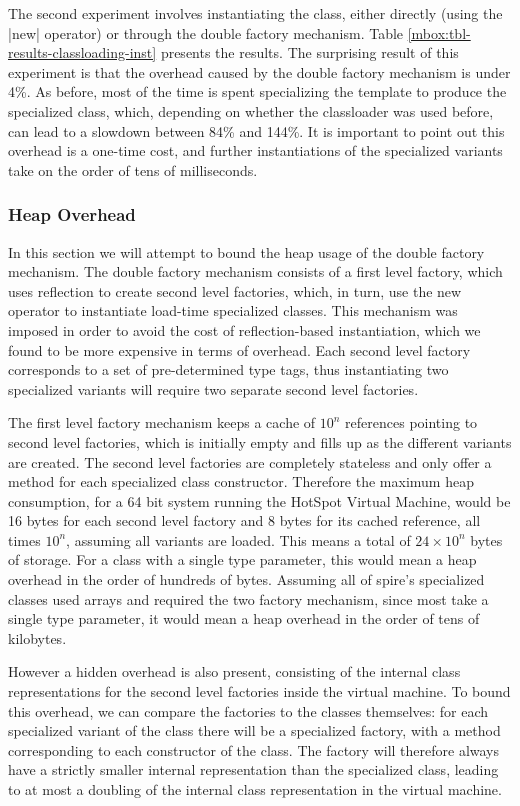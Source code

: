The second experiment involves instantiating the class, either directly (using the |new| operator) or through the double factory mechanism. Table \ref{mbox:tbl-results-classloading-inst} presents the results. The surprising result of this experiment is that the overhead caused by the double factory mechanism is under 4\%. As before, most of the time is spent specializing the template to produce the specialized class, which, depending on whether the classloader was used before, can lead to a slowdown between 84\% and 144\%. It is important to point out this overhead is a one-time cost, and further instantiations of the specialized variants take on the order of tens of milliseconds.

\subsubsection*{Heap Overhead}

In this section we will attempt to bound the heap usage of the double factory mechanism. The double factory mechanism consists of a first level factory, which uses reflection to create second level factories, which, in turn, use the new operator to instantiate load-time specialized classes. This mechanism was imposed in order to avoid the cost of reflection-based instantiation, which we found to be more expensive in terms of overhead. Each second level factory corresponds to a set of pre-determined type tags, thus instantiating two specialized variants will require two separate second level factories.

The first level factory mechanism keeps a cache of $10^n$ references pointing to second level factories, which is initially empty and fills up as the different variants are created. The second level factories are completely stateless and only offer a method for each specialized class constructor. Therefore the maximum heap consumption, for a 64 bit system running the HotSpot Virtual Machine, would be 16 bytes for each second level factory and 8 bytes for its cached reference, all times $10^n$, assuming all variants are loaded. This means a total of $24 \times 10^n$ bytes of storage. For a class with a single type parameter, this would mean a heap overhead in the order of hundreds of bytes. Assuming all of spire's specialized classes used arrays and required the two factory mechanism, since most take a single type parameter, it would mean a heap overhead in the order of tens of kilobytes.

However a hidden overhead is also present, consisting of the internal class representations for the second level factories inside the virtual machine. To bound this overhead, we can compare the factories to the classes themselves: for each specialized variant of the class there will be a specialized factory, with a method corresponding to each constructor of the class. The factory will therefore always have a strictly smaller internal representation than the specialized class, leading to at most a doubling of the internal class representation in the virtual machine.

